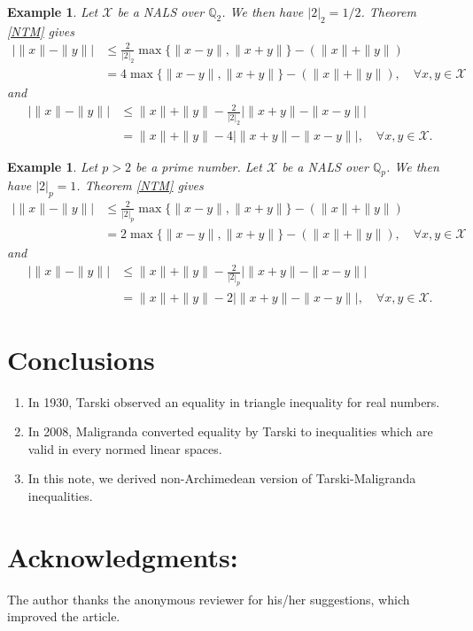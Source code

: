 \documentclass{amsart}
\newtheorem{example}[theorem]{Example}
\begin{document}
\begin{example}
	Let $\mathcal{X}$ be a NALS over $\mathbb{Q}_2$. We then have $|2|_2=1/2$. Theorem \ref{NTM} gives 
	\begin{align*}
		\bigg|\|x\|-\|y\|\bigg|&\leq \frac{2}{|2|_2}\max\{\|x-y\|, \|x+y\|\}-(\|x\|+\|y\|)\\
		&=4\max\{\|x-y\|, \|x+y\|\}-(\|x\|+\|y\|), \quad \forall x, y \in \mathcal{X}
	\end{align*}
and 
\begin{align*}
	\bigg|\|x\|-\|y\|\bigg|&\leq \|x\|+\|y\|-\frac{2}{|2|_2}\bigg|\|x+y\|-\|x-y\|\bigg|\\
	&=\|x\|+\|y\|-4\bigg|\|x+y\|-\|x-y\|\bigg|, \quad \forall x, y \in \mathcal{X}.
\end{align*}	
\end{example}
\begin{example}
	Let $p>2$ be a prime number. 	Let $\mathcal{X}$ be a NALS over $\mathbb{Q}_p$. We then have $|2|_p=1$. Theorem \ref{NTM} gives 
	\begin{align*}
		\bigg|\|x\|-\|y\|\bigg|&\leq \frac{2}{|2|_p}\max\{\|x-y\|, \|x+y\|\}-(\|x\|+\|y\|)\\
		&=2\max\{\|x-y\|, \|x+y\|\}-(\|x\|+\|y\|), \quad \forall x, y \in \mathcal{X}
	\end{align*}
	and 
	\begin{align*}
		\bigg|\|x\|-\|y\|\bigg|&\leq \|x\|+\|y\|-\frac{2}{|2|_p}\bigg|\|x+y\|-\|x-y\|\bigg|\\
		&=\|x\|+\|y\|-2\bigg|\|x+y\|-\|x-y\|\bigg|, \quad \forall x, y \in \mathcal{X}.
	\end{align*}	
\end{example}


\section{Conclusions}
\begin{enumerate}
	\item In 1930, Tarski observed an equality in triangle inequality for real numbers.
	\item In 2008, Maligranda converted equality by Tarski to  inequalities which are valid in every normed linear spaces.
\item In this note, we  derived non-Archimedean version of Tarski-Maligranda inequalities. 
\end{enumerate}


\section{Acknowledgments:} The author thanks the anonymous reviewer for his/her  suggestions, which improved the article.
 
 
 
\end{document}
